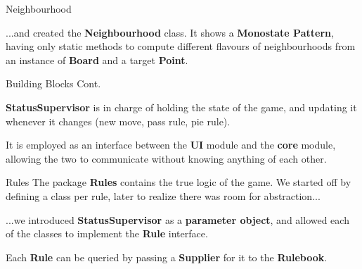 \documentclass{beamer}
\begin{document}
     \begin{frame} {Neighbourhood}

     ...and created the \textbf{Neighbourhood} class. It shows a \textbf{Monostate Pattern}, having only static methods to compute different flavours of neighbourhoods from an instance of \textbf{Board} and a target \textbf{Point}.

     \end{frame}


     \begin{frame} {Building Blocks Cont.}

     \textbf{StatusSupervisor} is in charge of holding the state of the game, and updating it whenever it changes (new move, pass rule, pie rule).

     \vspace{1em}

     It is employed as an interface between the \textbf{UI} module and the \textbf{core} module, allowing the two to communicate without knowing anything of each other.

     \end{frame}

     \begin{frame} {Rules}
     The package \textbf{Rules} contains the true logic of the game. We started off by defining a class per rule, later to realize there was room for abstraction...

  	\vspace{1em}

     ...we introduced \textbf{StatusSupervisor} as a \textbf{parameter object}, and allowed each of the classes to implement the \textbf{Rule} interface.

     \vspace{1em}

     Each \textbf{Rule} can be queried by passing a \textbf{Supplier} for it to the \textbf{Rulebook}.

     \end{frame}
\end{document}
